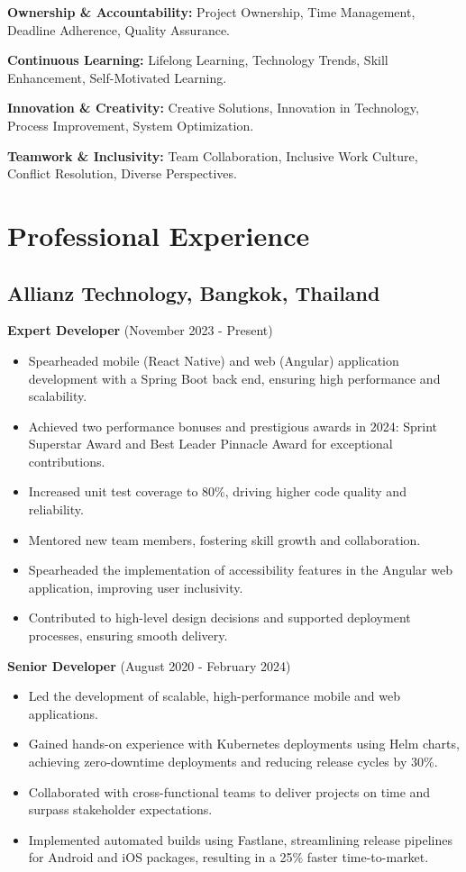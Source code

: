 \documentclass[10pt, letterpaper]{article}
\newenvironment{highlights}{
    \begin{itemize}[
        topsep=0.10cm,
        parsep=0.10cm,
        partopsep=0pt,
        itemsep=0pt,
        leftmargin=0.4cm + 10pt
    ]
}{
    \end{itemize}
}
\begin{document}
\noindent \textbf{Ownership \& Accountability:} Project Ownership, Time Management, Deadline Adherence, Quality Assurance.

\noindent \textbf{Continuous Learning:} Lifelong Learning, Technology Trends, Skill Enhancement, Self-Motivated Learning.

\noindent \textbf{Innovation \& Creativity:} Creative Solutions, Innovation in Technology, Process Improvement, System Optimization.

\noindent \textbf{Teamwork \& Inclusivity:} Team Collaboration, Inclusive Work Culture, Conflict Resolution, Diverse Perspectives.

\section*{Professional Experience}

\subsection*{Allianz Technology, Bangkok, Thailand}

\noindent \textbf{Expert Developer} (November 2023 - Present)
\begin{highlights}
    \item Spearheaded mobile (React Native) and web (Angular) application development with a Spring Boot back end, ensuring high performance and scalability.
    \item Achieved two performance bonuses and prestigious awards in 2024: Sprint Superstar Award and Best Leader Pinnacle Award for exceptional contributions.
    \item Increased unit test coverage to 80\%, driving higher code quality and reliability.
    \item Mentored new team members, fostering skill growth and collaboration.
    \item Spearheaded the implementation of accessibility features in the Angular web application, improving user inclusivity.
    \item Contributed to high-level design decisions and supported deployment processes, ensuring smooth delivery.
\end{highlights}

\noindent \textbf{Senior Developer} (August 2020 - February 2024)
\begin{highlights}
    \item Led the development of scalable, high-performance mobile and web applications.
    \item Gained hands-on experience with Kubernetes deployments using Helm charts, achieving zero-downtime deployments and reducing release cycles by 30\%.
    \item Collaborated with cross-functional teams to deliver projects on time and surpass stakeholder expectations.
    \item Implemented automated builds using Fastlane, streamlining release pipelines for Android and iOS packages, resulting in a 25\% faster time-to-market.
\end{highlights}
\end{document}
